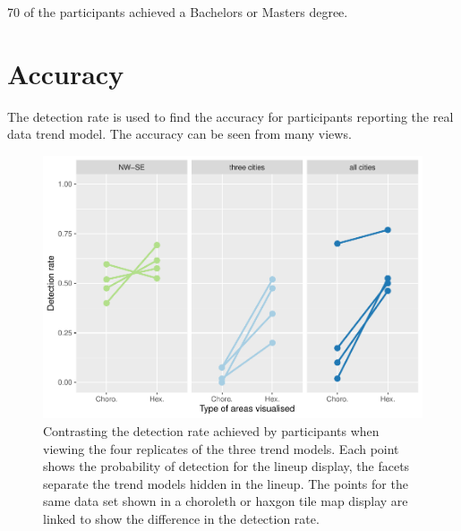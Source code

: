 \documentclass[conference,final,]{IEEEtran}
\makeatletter
\def\maxwidth{\ifdim\Gin@nat@width>\linewidth\linewidth
\else\Gin@nat@width\fi}
\let\Oldincludegraphics\includegraphics
\renewcommand{\includegraphics}[1]{\Oldincludegraphics[width=\maxwidth]{#1}}
\makeatother
\begin{document}
70 of the participants achieved a Bachelors or Masters degree.

\hypertarget{accuracy}{%
\section{Accuracy}\label{accuracy}}

The detection rate is used to find the accuracy for participants
reporting the real data trend model. The accuracy can be seen from many
views.

\begin{figure}
\centering
\includegraphics{paper_files/figure-latex/detection_compare-1.pdf}
\caption{Contrasting the detection rate achieved by participants when
viewing the four replicates of the three trend models. Each point shows
the probability of detection for the lineup display, the facets separate
the trend models hidden in the lineup. The points for the same data set
shown in a choroleth or haxgon tile map display are linked to show the
difference in the detection rate.}
\end{figure}
\end{document}
